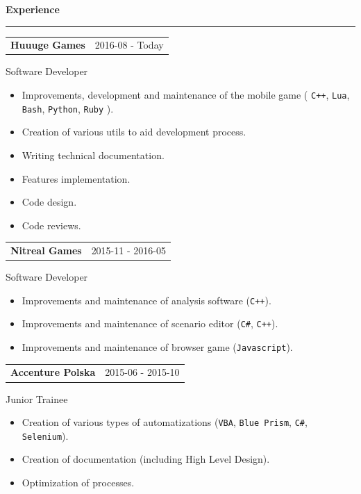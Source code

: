 \documentclass{article}
\newcommand{\header}[1] 
{
	\textbf{\large #1}
	\vspace{0.005\textheight}
	\hrule 
	\vspace{0.005\textheight}
}
\begin{document}
\header{Experience}

\begin{tabular}{@{} m{} R{0.37\textwidth} }
\textbf{Huuuge Games}	& {2016-08 - Today} 
\end{tabular}
Software Developer\\
\begin{itemize}
	\item Improvements, development and maintenance of the mobile game ( \texttt{C++}, \texttt{Lua}, \texttt{Bash}, \texttt{Python}, \texttt{Ruby} ).
	\item Creation of various utils to aid development process.
	\item Writing technical documentation.
	\item Features implementation.
	\item Code design.
	\item Code reviews.
\end{itemize}

\begin{tabular}{@{} m{} R{0.37\textwidth} }
\textbf{Nitreal Games}	& {2015-11 - 2016-05} 
\end{tabular}
Software Developer\\
\begin{itemize}
	\item Improvements and maintenance of analysis software (\texttt{C++}).
	\item Improvements and maintenance of scenario editor (\texttt{C\#}, \texttt{C++}).
	\item Improvements and maintenance of browser game (\texttt{Javascript}).
\end{itemize}

\begin{tabular}{@{} m{} R{0.37\textwidth} }
\textbf{Accenture Polska}	& {2015-06 - 2015-10} 
\end{tabular}
Junior Trainee\\
\begin{itemize}
	\item Creation of various types of automatizations (\texttt{VBA}, \texttt{Blue Prism}, \texttt{C\#}, \texttt{Selenium}).
	\item Creation of documentation (including High Level Design).
	\item Optimization of processes. 
\end{itemize}
\end{document}
